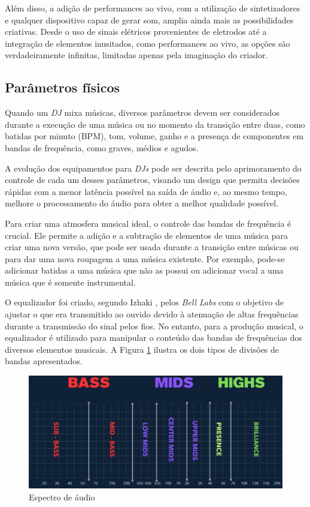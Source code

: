 Além disso, a adição de performances ao vivo, com a utilização de sintetizadores e qualquer dispositivo capaz de gerar som, amplia ainda mais as possibilidades criativas. Desde o uso de sinais elétricos provenientes de eletrodos até a integração de elementos inusitados, como performances ao vivo, as opções são verdadeiramente infinitas, limitadas apenas pela imaginação do criador.

\subsection{Parâmetros físicos}

Quando um \textit{DJ} mixa músicas, diversos parâmetros devem ser considerados durante a execução de uma música ou no momento da transição entre duas, como batidas por minuto (BPM), tom, volume, ganho e a presença de componentes em bandas de frequência, como graves, médios e agudos.

A evolução dos equipamentos para \textit{DJs} pode ser descrita pelo aprimoramento do controle de cada um desses parâmetros, visando um design que permita decisões  rápidas com a menor latência possível na saída de áudio e, ao mesmo tempo, melhore o processamento do áudio para obter a melhor qualidade possível.

Para criar uma atmosfera musical ideal, o controle das bandas de frequência é crucial. Ele permite a adição e a subtração de elementos de uma música para criar uma nova versão, que pode ser usada durante a transição entre músicas ou para dar uma nova roupagem a uma música existente. Por exemplo, pode-se adicionar batidas a uma música que não as possui ou adicionar vocal a uma música que é somente instrumental.

O equalizador foi criado, segundo Izhaki \cite{mixing}, pelos \textit{Bell Labs} com o objetivo de ajustar o que era transmitido ao ouvido devido à atenuação de altas frequências durante a transmissão do sinal pelos fios. No entanto, para a produção musical, o equalizador é utilizado para manipular o conteúdo das bandas de frequências dos diversos elementos musicais. A Figura \ref{fig09} ilustra os dois tipos de divisões de bandas apresentados.

\begin{figure}[h]
	\centering
    \includegraphics[scale=0.4]{figuras/fig09.eps}
	\caption{Espectro de áudio \cite{headphonestyAudioFrequency}}
	\label{fig09}
\end{figure}

